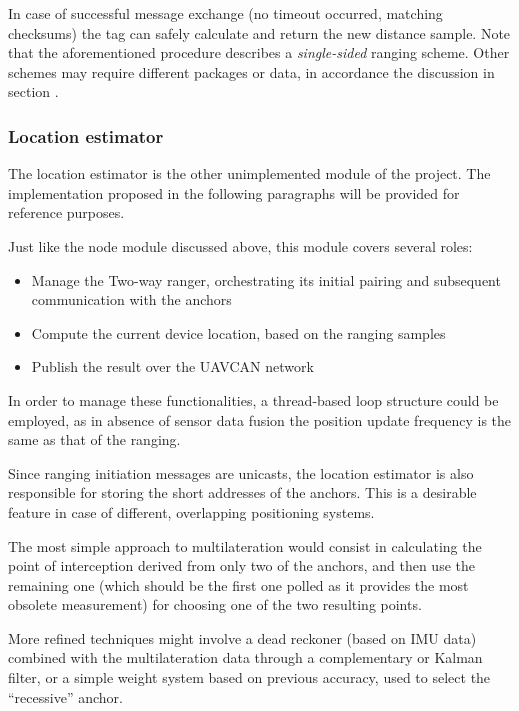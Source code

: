In case of successful message exchange (no timeout occurred, matching checksums) the tag can safely calculate and return the new distance sample.
Note that the aforementioned procedure describes a \emph{single-sided} ranging scheme.
Other schemes may require different packages or data, in accordance the discussion in section .


\subsubsection{Location estimator}
The location estimator is the other unimplemented module of the project.
The implementation proposed in the following paragraphs will be provided for reference purposes.

Just like the node module discussed above, this module covers several roles:
\begin{itemize}
    \item Manage the Two-way ranger, orchestrating its initial pairing and subsequent communication with the anchors
    \item Compute the current device location, based on the ranging samples
    \item Publish the result over the UAVCAN network
\end{itemize}

In order to manage these functionalities, a thread-based loop structure could be employed, as in absence of sensor data fusion the position update frequency is the same as that of the ranging.

Since ranging initiation messages are unicasts, the location estimator is also responsible for storing the short addresses of the anchors.
This is a desirable feature in case of different, overlapping positioning systems.

The most simple approach to multilateration would consist in calculating the point of interception derived from only two of the anchors, and then use the remaining one (which should be the first one polled as it provides the most obsolete measurement) for choosing one of the two resulting points.

More refined techniques might involve a dead reckoner (based on IMU data) combined with the multilateration data through a complementary or Kalman filter, or a simple weight system based on previous accuracy, used to select the ``recessive'' anchor.
